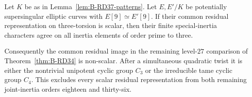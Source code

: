 \begin{proposition}
\label{prop:B-RD37}
Let $K$ be as in Lemma~\ref{lem:B-RD37-patterns}. Let $E,E'/K$
be potentially supersingular elliptic curves with
$E[9]\simeq E'[9]$. If their common residual representation on
three-torsion is scalar, then their finite special-inertia characters
agree on all inertia elements of order prime to three.

Consequently the common residual image in the remaining level-$27$
comparison of Theorem~\ref{thm:B-RD34} is non-scalar. After a
simultaneous quadratic twist it is either the nontrivial unipotent
cyclic group $C_3$ or the irreducible tame cyclic group $C_4$.
This excludes every scalar residual representation from both
remaining joint-inertia orders eighteen and thirty-six.
\end{proposition}
